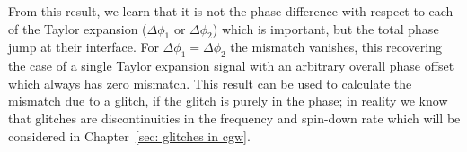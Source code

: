 \documentclass[../full_thesis/full_thesis.tex]{subfiles}
\begin{document}
From this result, we learn that it is not the phase difference with respect to
each of the Taylor expansion ($\Delta\phi_1$ or $\Delta\phi_2$) which is
important, but the total phase jump at their interface. For $\Delta \phi_{1} =
\Delta \phi_{2}$ the mismatch vanishes, this recovering the case of a single
Taylor expansion signal with an arbitrary overall phase offset which always has
zero mismatch. This result can be used to calculate the mismatch due to a glitch,
if the glitch is purely in the phase; in reality we know that glitches are
discontinuities in the frequency and spin-down rate which will be considered in
Chapter~\ref{sec: glitches in cgw}.

\end{document}
